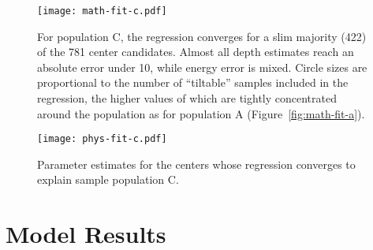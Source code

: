 \begin{figure}
    \texttt{[image: math-fit-c.pdf]}
    \caption[Population C: Goodness of Fit]{For population C, the regression converges for a slim majority (422) of the 781 center candidates. Almost all depth estimates reach an absolute error under 10, while energy error is mixed. Circle sizes are proportional to the number of ``tiltable'' samples included in the regression, the higher values of which are tightly concentrated around the population as for population A (Figure~\ref{fig:math-fit-a}).}%
    \label{fig:math-fit-c}
\end{figure}

\begin{figure}
    \texttt{[image: phys-fit-c.pdf]}%
    \caption[Population C: Parameter Estimates]{Parameter estimates for the centers whose regression converges to explain sample population C.}%
    \label{fig:phys-fit-c}
\end{figure}


\section{Model Results}

